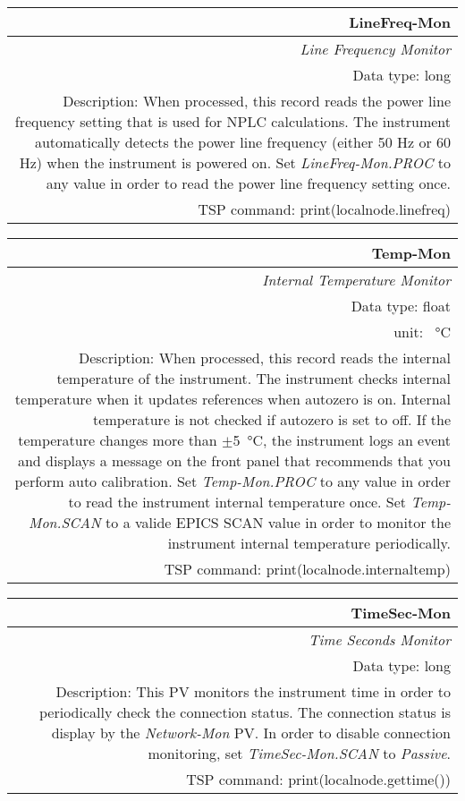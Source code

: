 \documentclass[openany]{article}
\begin{document}
		\begin{tabular}{N}
			\hline
			\bfseries LineFreq-Mon\label{pv:linefreq-mon} \\ \hline
			\emph{Line Frequency Monitor} \\
			Data type: long \\
			Description: When processed, this record reads the power line frequency setting that is used for NPLC calculations. The instrument automatically detects the power line frequency (either 50 Hz or 60 Hz) when the instrument is powered on. Set \emph{LineFreq-Mon.PROC} to any value in order to read the power line frequency setting once. \\
			TSP command: print(localnode.linefreq)
		\end{tabular}

		\begin{tabular}{N}
			\hline
			\bfseries Temp-Mon\label{pv:temp-mon} \\ \hline
			\emph{Internal Temperature Monitor} \\
			Data type: float \\
			unit: \SI{}{\degreeCelsius} \\
			Description: When processed, this record reads the internal temperature of the instrument. The instrument checks internal temperature when it updates references when autozero is on. Internal temperature is not checked if autozero is set to off. If the temperature changes more than $\pm$\SI{5}{\degreeCelsius}, the instrument logs an event and displays a message on the front panel that recommends that you perform auto calibration. Set \emph{Temp-Mon.PROC} to any value in order to read the instrument internal temperature once. Set \emph{Temp-Mon.SCAN} to a valide EPICS SCAN value in order to monitor the instrument internal temperature periodically. \\
			TSP command: print(localnode.internaltemp)
		\end{tabular}

		\begin{tabular}{N}
			\hline
			\bfseries TimeSec-Mon\label{pv:timesec-mon} \\ \hline
			\emph{Time Seconds Monitor} \\
			Data type: long \\
			Description: This PV monitors the instrument time in order to periodically check the connection status. The connection status is display by the \emph{Network-Mon} PV. In order to disable connection monitoring, set \emph{TimeSec-Mon.SCAN} to \emph{Passive}. \\
			TSP command: print(localnode.gettime())
		\end{tabular}
\end{document}
